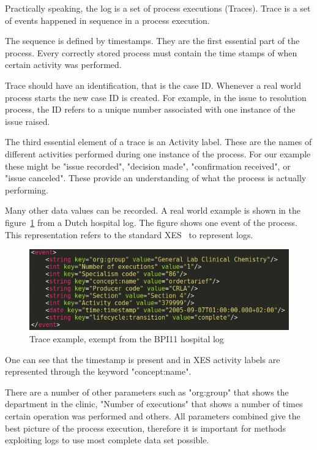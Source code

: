 Practically speaking, the log is a set of process executions (Traces). Trace is a set of events happened in sequence in a process execution.

The sequence is defined by timestamps. They are the first essential part of the process. Every correctly stored process must contain the time stamps of when certain activity was performed. 

Trace should have an identification, that is the case ID. Whenever a real world process starts the new case ID is created. For example, in the issue to resolution process, the ID refers to a unique number associated with one instance of the issue raised. 

The third essential element of a trace is an Activity label. These are the names of different activities performed during one instance of the process. For our example these might be "issue recorded", "decision made", "confirmation received", or "issue canceled". These provide an understanding of what the process is actually performing. 

Many other data values can be recorded. A real world example is shown in the figure~\ref{figure:trace-example-1} from a Dutch hospital log. The figure shows one event of the process. This representation refers to the standard XES~\cite{Verbeek2011} to represent logs.


\begin{figure}[!ht]
	\begin{center}  
		\includegraphics[width=\textwidth]{3_event_example.png}
		\caption{Trace example, exempt from the BPI11 hospital log~\cite{bpichallenge2011}}
		\label{figure:trace-example-1}	
	\end{center}
\end{figure}

One can see that the timestamp is present and in XES activity labels are represented through the keyword "concept:name".

There are a number of other parameters such as "org:group" that shows the department in the clinic, "Number of executions" that shows a number of times certain operation was performed and others.  All parameters combined give the best picture of the process execution, therefore it is important for methods exploiting logs to use most complete data set possible.


